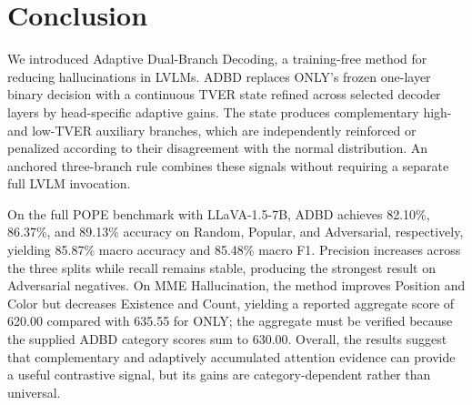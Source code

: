 \section{Conclusion}
\label{sec:conclusion}

We introduced Adaptive Dual-Branch Decoding, a training-free method for reducing hallucinations in LVLMs. ADBD replaces ONLY's frozen one-layer binary decision with a continuous TVER state refined across selected decoder layers by head-specific adaptive gains. The state produces complementary high- and low-TVER auxiliary branches, which are independently reinforced or penalized according to their disagreement with the normal distribution. An anchored three-branch rule combines these signals without requiring a separate full LVLM invocation.

On the full POPE benchmark with LLaVA-1.5-7B, ADBD achieves 82.10\%, 86.37\%, and 89.13\% accuracy on Random, Popular, and Adversarial, respectively, yielding 85.87\% macro accuracy and 85.48\% macro F1. Precision increases across the three splits while recall remains stable, producing the strongest result on Adversarial negatives. On MME Hallucination, the method improves Position and Color but decreases Existence and Count, yielding a reported aggregate score of 620.00 compared with 635.55 for ONLY; the aggregate must be verified because the supplied ADBD category scores sum to 630.00. Overall, the results suggest that complementary and adaptively accumulated attention evidence can provide a useful contrastive signal, but its gains are category-dependent rather than universal.
